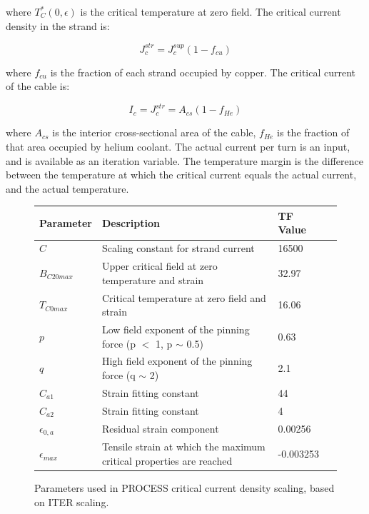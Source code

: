 \documentclass[hidelinks]{article}
\numberwithin{equation}{section}
\begin{document}
    \noi where $T^*_{C}(0,\epsilon)$ is the critical temperature at zero field. The 
    critical current density in the strand is:

    \begin{equation}\label{eq: crit-curr-den}
        J^{str}_{c} = J^{sup}_c (1-f_{cu})
    \end{equation}

    \noi where $f_{cu}$ is the fraction of each strand occupied by copper. The 
    critical current of the cable is:

    \begin{equation}\label{eq: crit-curr-cable}
        I_c = J^{str}_c = A_{cs}(1-f_{He}) 
    \end{equation}

    \noi where $A_{cs}$ is the interior cross-sectional area of the cable, $f_{He}$ is 
    the fraction of that area occupied by helium coolant. The actual current per turn 
    is an input, and is available as an iteration variable. The temperature margin is 
    the difference between the temperature at which the critical current equals the 
    actual current, and the actual temperature. 

    \begin{figure}[t!]
     \begin{center}
      \begin{tabular}{lllc}
       Parameter & Description & TF Value  \\
       \toprule
       $C$ & Scaling constant for strand current & 16500 \\
       $B_{C20max}$ & Upper critical field at zero temperature and strain & 32.97 \\
       $T_{C0max}$ & Critical temperature at zero field and strain & 16.06 \\
       $p$ & Low field exponent of the pinning force (p $<$ 1, p $\sim$ 0.5) & 0.63 \\
       $q$ & High field exponent of the pinning force (q $\sim$ 2) & 2.1 \\
       $C_{a1}$ & Strain fitting constant & 44 \\
       $C_{a2}$ & Strain fitting constant & 4 \\
       $\epsilon_{0,a}$ & Residual strain component & 0.00256 \\
       $\epsilon_{max}$ & Tensile strain at which the maximum critical properties are reached & -0.003253 \\
       \bottomrule
      \end{tabular}
     \end{center}
     \caption{Parameters used in PROCESS critical current density scaling, 
     based on ITER scaling.}\label{fig: iter-crit-scaling}
    \end{figure}
\end{document}
